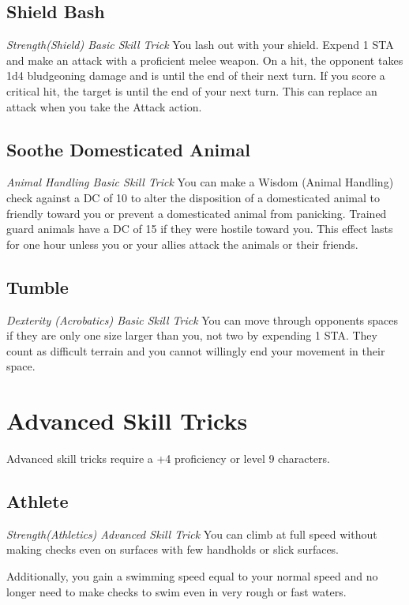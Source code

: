 \subsection{Shield Bash}
\textit{Strength(Shield) Basic Skill Trick}
You lash out with your shield. Expend 1 STA and make an attack with a proficient melee weapon. On a hit, the opponent takes 1d4 bludgeoning damage and is  until the end of their next turn. If you score a critical hit, the target is  until the end of your next turn. This can replace an attack when you take the Attack action.

\subsection{Soothe Domesticated Animal}
\textit{Animal Handling Basic Skill Trick}
You can make a Wisdom (Animal Handling) check against a DC of 10 to alter the disposition of a domesticated animal to friendly toward you or prevent a domesticated animal from panicking. Trained guard animals have a DC of 15 if they were hostile toward you. This effect lasts for one hour unless you or your allies attack the animals or their friends.

\subsection{Tumble}
\textit{Dexterity (Acrobatics) Basic Skill Trick}
You can move through opponents spaces if they are only one size larger than you, not two by expending 1 STA. They count as difficult terrain and you cannot willingly end your movement in their space.

\section{Advanced Skill Tricks}
\label{sec:skill-tricks-advanced}

Advanced skill tricks require a +4 proficiency or level 9 characters.

\subsection{Athlete}
\textit{Strength(Athletics) Advanced Skill Trick}
You can climb at full speed without making checks even on surfaces with few handholds or slick surfaces.

Additionally, you gain a swimming speed equal to your normal speed and no longer need to make checks to swim even in very rough or fast waters.

